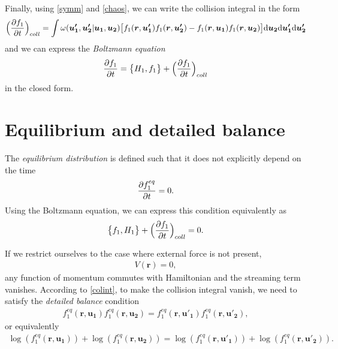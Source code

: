 Finally, using \ref{symm} and \ref{chaos}, we can write the collision integral in the form
\begin{align} \label{colint}
\Big( \frac{\partial f_1}{\partial t} \Big)_{coll}= \int \omega(\bm{u'_1},\bm{u'_2} | \bm{u_1}, \bm{u_2}) \big[f_1(\bm{r},\bm{u'_1})f_1(\bm{r},\bm{u'_2}) - f_1(\bm{r},\bm{u_1})f_1(\bm{r},\bm{u_2}) \big] \mathrm{d} \bm{u_2} \mathrm{d} \bm{u'_1} \mathrm{d} \bm{u'_2}
\end{align}
and we can express the \textit{Boltzmann equation}
\begin{align} \label{Boltz}
\frac{\partial f_1}{\partial t}  = \big\{ H_1, f_1 \big\} + \Big(\frac{\partial f_1}{\partial t} \Big)_{coll}
\end{align}
in the closed form.

\section{Equilibrium and detailed balance}
The \textit{equilibrium distribution} is defined such that it does not explicitly depend on the time
\begin{align*}
\frac{\partial f_1^{eq}}{\partial t} = 0.
\end{align*}
Using the Boltzmann equation, we can express this condition equivalently as
\begin{align*}
\big\{ f_1, H_1 \big\} + \Big( \frac{\partial f_1}{\partial t} \Big)_{coll} = 0.
\end{align*}


If we restrict ourselves to the case where external force is not present,
\begin{align*}
V(\bm{r}) = 0,
\end{align*}
any function of momentum commutes with Hamiltonian and the streaming term vanishes.
According to \ref{colint}, to make the collision integral vanish, we need to satisfy the \textit{detailed balance} condition
\begin{align} \label{detailedbalance}
f_1^{eq}(\bm{r},\bm{u_1})f_1^{eq}(\bm{r},\bm{u_2}) = f_1^{eq}(\bm{r},\bm{u'_1})f_1^{eq}(\bm{r},\bm{u'_2}),
\end{align}
or equivalently
\begin{align*}
\log(f_1^{eq}(\bm{r},\bm{u_1})) + \log(f_1^{eq}(\bm{r},\bm{u_2})) = \log(f_1^{eq}(\bm{r},\bm{u'_1})) + \log(f_1^{eq}(\bm{r},\bm{u'_2})).
\end{align*}

